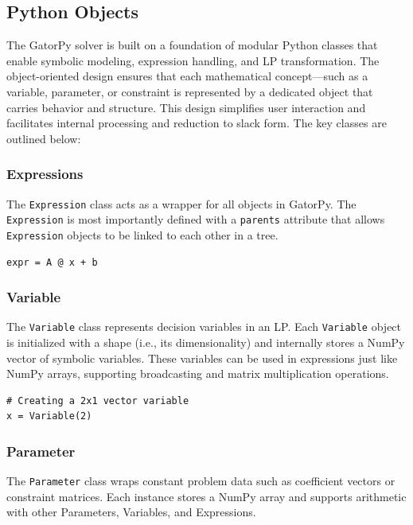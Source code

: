 \documentclass[conference]{IEEEtran}
\begin{document}
\subsection{Python Objects} 
\label{Objects}

The GatorPy solver is built on a foundation of modular Python classes that enable symbolic modeling, expression handling, and LP transformation. 
The object-oriented design ensures that each mathematical concept—such as a variable, parameter, or constraint is represented by a dedicated object that carries behavior and structure. 
This design simplifies user interaction and facilitates internal processing and reduction to slack form. 
The key classes are outlined below:

\subsubsection{Expressions} 
The \texttt{Expression} class acts as a wrapper for all objects in GatorPy.
The \texttt{Expression} is most importantly defined with a \texttt{parents} attribute that allows \texttt{Expression} objects to be linked to each other in a tree.

\begin{lstlisting}[style=mypython] 
    expr = A @ x + b 
\end{lstlisting}    

\subsubsection{Variable} 
The \texttt{Variable} class represents decision variables in an LP. 
Each \texttt{Variable} object is initialized with a shape (i.e., its dimensionality) and internally stores a NumPy vector of symbolic variables. 
These variables can be used in expressions just like NumPy arrays, supporting broadcasting and matrix multiplication operations.

\begin{lstlisting}[style=mypython] 
# Creating a 2x1 vector variable
x = Variable(2) 
\end{lstlisting}

\subsubsection{Parameter} 
The \texttt{Parameter} class wraps constant problem data such as coefficient vectors or constraint matrices. 
Each instance stores a NumPy array and supports arithmetic with other Parameters, Variables, and Expressions.
\end{document}
